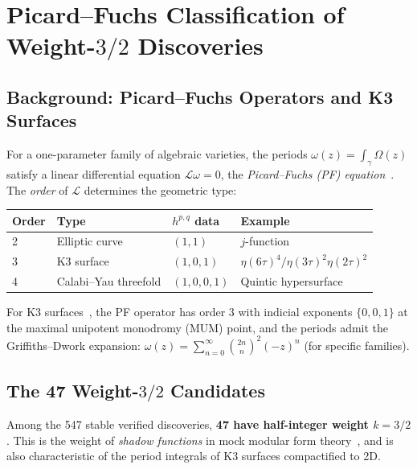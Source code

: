 \section{Picard--Fuchs Classification of Weight-$3/2$ Discoveries}
\label{sec:picard_fuchs}

\subsection{Background: Picard--Fuchs Operators and K3 Surfaces}

For a one-parameter family of algebraic varieties, the periods
$\omega(z) = \int_\gamma \Omega(z)$ satisfy a linear differential equation
$\mathcal{L} \omega = 0$, the \emph{Picard--Fuchs (PF) equation}~\cite{picard_fuchs}.
The \emph{order} of $\mathcal{L}$ determines the geometric type:

\begin{center}
\begin{tabular}{llll}
\toprule
\textbf{Order} & \textbf{Type} & \textbf{$h^{p,q}$ data} & \textbf{Example} \\
\midrule
2 & Elliptic curve & $(1,1)$ & $j$-function \\
3 & K3 surface & $(1,0,1)$ & $\eta(6\tau)^4/\eta(3\tau)^2\eta(2\tau)^2$ \\
4 & Calabi--Yau threefold & $(1,0,0,1)$ & Quintic hypersurface \\
\bottomrule
\end{tabular}
\end{center}

For K3 surfaces~\cite{picard_fuchs}, the PF operator has order 3 with indicial exponents
$\{0, 0, 1\}$ at the maximal unipotent monodromy (MUM) point, and the periods
admit the Griffiths--Dwork expansion:
$\omega(z) = \sum_{n=0}^\infty \binom{2n}{n}^2 (-z)^n$ (for specific families).

\subsection{The 47 Weight-$3/2$ Candidates}

Among the 547 stable verified discoveries, \textbf{47 have half-integer weight $k = 3/2$}.
This is the weight of \emph{shadow functions} in mock modular form theory~\cite{zwegers2002},
and is also characteristic of the period integrals of K3 surfaces compactified to 2D.

